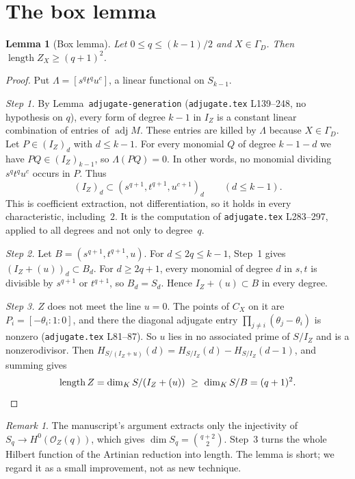 \documentclass[11pt]{amsart}
\newtheorem{lemma}[theorem]{Lemma}
\theoremstyle{remark}
\newtheorem{remark}[theorem]{Remark}
\DeclareMathOperator{\adj}{adj}
\DeclareMathOperator{\len}{length}
\begin{document}
\section{The box lemma}
\begin{lemma}[Box lemma]\label{lem:box}
Let $0\le q\le (k-1)/2$ and $X\in\Gamma_D$. Then $\len Z_X\ge(q+1)^2$.
\end{lemma}

\begin{proof}
Put $\Lambda=[s^qt^qu^c]$, a linear functional on $S_{k-1}$.

\emph{Step 1.} By Lemma~\texttt{adjugate-generation} (\texttt{adjugate.tex}
L139--248, no hypothesis on $q$), every form of degree $k-1$ in $I_Z$ is a
constant linear combination of entries of $\adj M$. These entries are killed
by $\Lambda$ because $X\in\Gamma_D$. Let $P\in(I_Z)_d$ with $d\le k-1$. For every
monomial $Q$ of degree $k-1-d$ we have $PQ\in(I_Z)_{k-1}$, so $\Lambda(PQ)=0$.
In other words, no monomial dividing $s^qt^qu^c$ occurs in $P$. Thus
\[
(I_Z)_d\subset(s^{q+1},t^{q+1},u^{c+1})_d\qquad(d\le k-1).
\]
This is coefficient extraction, not differentiation, so it holds in every
characteristic, including~$2$. It is the computation of \texttt{adjugate.tex}
L283--297, applied to all degrees and not only to degree~$q$.

\emph{Step 2.} Let $B=(s^{q+1},t^{q+1},u)$. For $d\le 2q\le k-1$, Step~1 gives
$(I_Z+(u))_d\subset B_d$. For $d\ge2q+1$, every monomial of degree $d$ in $s,t$
is divisible by $s^{q+1}$ or $t^{q+1}$, so $B_d=S_d$. Hence
$I_Z+(u)\subset B$ in every degree.

\emph{Step 3.} $Z$ does not meet the line $u=0$. The points of $C_X$ on it are
$P_i=[-\theta_i:1:0]$, and there the diagonal adjugate entry
$\prod_{j\ne i}(\theta_j-\theta_i)$ is nonzero (\texttt{adjugate.tex} L81--87).
So $u$ lies in no associated prime of $S/I_Z$ and is a nonzerodivisor. Then
$H_{S/(I_Z+u)}(d)=H_{S/I_Z}(d)-H_{S/I_Z}(d-1)$, and summing gives
\[
\len Z=\dim_K S/(I_Z+(u))\ \ge\ \dim_K S/B=(q+1)^2. \qedhere
\]
\end{proof}

\begin{remark}
The manuscript's argument extracts only the injectivity of
$S_q\to H^0(\mathcal O_Z(q))$, which gives $\dim S_q=\binom{q+2}2$. Step~3
turns the whole Hilbert function of the Artinian reduction into length. The
lemma is short; we regard it as a small improvement, not as new technique.
\end{remark}
\end{document}
